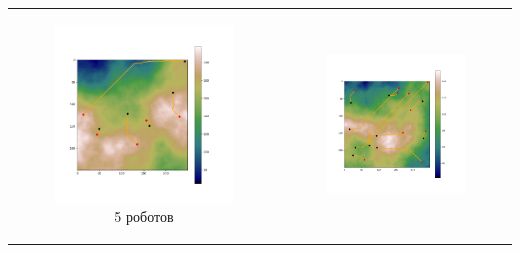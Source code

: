 \documentclass{article}
\numberwithin{equation}{section}
\begin{document}
	\begin{table}[H]
		\begin{tabular}{c c}
			\begin{subfigure}{0.5\linewidth}
				\includegraphics[width = 1.0\columnwidth]{data/mean_paths/250x250/5.png}
			\caption*{5 роботов}
			\end{subfigure}
			&
			\begin{subfigure}{0.5\linewidth}
				\includegraphics[width = 1.0\columnwidth]{data/mean_paths/250x250/10.png}

\end{subfigure}
\end{tabular}
\end{table}
\end{document}
